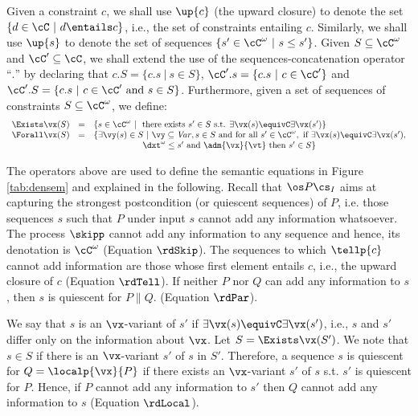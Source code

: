 \documentclass{tlp}
\begin{document}
 \begin{notation}\label{not:clos-seq}
    Given a constraint $c$, we shall use $\up{c}$ (the upward closure)  to denote the set $\{d \in \cC \  |\  d \entails c \}$, i.e., the set of constraints entailing $c$. Similarly, we shall use $\up{s}$ to denote the set of sequences $\{s' \in \cC^\omega \ | \ s \leq s' \}$.
Given $S\subseteq \cC^\omega$ and $\cC' \subseteq \cC$, we shall extend the use of  the sequences-concatenation operator ``$.$'' by declaring that $c.S = \{ c.s \ | \ s \in S\}$, $\cC'.s = \{ c.s \ | \ c \in \cC' \}$ and $\cC'.S = \{ c.s \ | \ c\in \cC' \mbox{ and } s\in S\} $. 
Furthermore, given a set of sequences of constraints $S\subseteq \cC^\omega$, we define:
 \[
 \begin{array}{lll}
 \Exists \vx(S) &=& \{s\in \cC^\omega \ | \ \mbox{ there exists } s'\in S \mbox{ s.t. }  \exists \vx (s) \equivC \exists \vx (s') \}\\
\Forall \vx (S) &=& \{ \exists \vy(s) \in S \  |  \
  \vy \subseteq {\it Var}, s \in S 
    \mbox{ and for all  } s' \in \cC^\omega, \mbox{ if } 
  \exists \vx (s) \equivC \exists \vx (s') \mbox{,} \\
  & & \qquad\qquad\quad\ 
 \ \dxt^\omega \leq s' \mbox{ and } \adm{\vx}{\vt}  \mbox{ then } s' \in S  \}
\end{array}
 \]
 \end{notation}
The operators above are used to define the semantic equations  in Figure \ref{tab:densem} and explained in the following. 
 Recall that $\os P \cs_I$ aims at capturing the strongest postcondition (or quiescent sequences) of $P$, i.e. those  sequences $s$ such that $P$ under input $s$ cannot add any information whatsoever. The process $\skipp$ cannot add any information to any sequence and hence, its denotation is $\cC^\omega$ (Equation $\rdSkip$).    The sequences to which $\tellp{c}$ cannot add information are those whose first element entails $c$, i.e., the upward closure of $c$ (Equation $\rdTell$). If neither $P$ nor $Q$ can add any information to $s$, then $s$ is quiescent for $P\parallel Q$. (Equation $\rdPar$). 
  
  We say that  $s$ is an ${\vx}$-variant of $s'$ if
$\exists\vx(s)\equivC\exists\vx(s')$, i.e., $s$ and $s'$ differ only on the information about  $\vx$. Let $S=\Exists \vx(S')$. We note that 
$s\in S$ if there is an $\vx$-variant $s'$ of $s$ in $S'$. 
Therefore, a sequence $s$ is  quiescent for $Q=\localp{\vx}{P}$ if there exists an $\vx$-variant $s'$ of $s$ s.t. $s'$ is quiescent for $P$.  Hence, if $P$ cannot add any information to $s'$ then  $Q$ cannot add any information to $s$ (Equation $\rdLocal$). 
\end{document}
